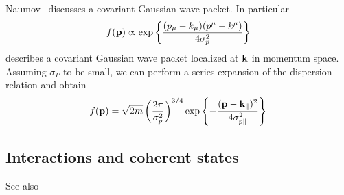 Naumov~\cite{Naumov2013} discusses a covariant Gaussian wave packet. In particular
\begin{equation}
	f(\vb{p})
	\propto
	\exp\left\{\frac{(p_\mu-k_\mu)(p^\mu-k^\mu)}{4\sigma_p^2}\right\}
\end{equation}
describes a covariant Gaussian wave packet localized at $\vb{k}$ in momentum space.
Assuming $\sigma_P$ to be small, we can perform a series expansion of the dispersion relation and obtain
\begin{equation}
	f(\vb{p})
	=
	\sqrt{2m}
	\left(\frac{2\pi}{\sigma_p^2}\right)^{3/4}
	\exp\left\{
		-\frac{(\vb{p}-\vb{k}_\parallel)^2}{4\sigma_{p\parallel}^2}
	\right\}
\end{equation}

\subsection{Interactions and coherent states}

See also \cite{Itzykson2012}
